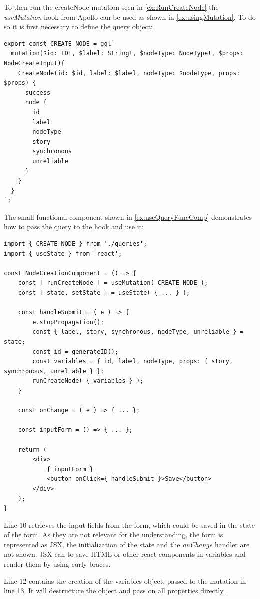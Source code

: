 To then run the createNode mutation seen in \autoref{ex:RunCreateNode} the \emph{useMutation} hook from Apollo can be used as shown in \autoref{ex:usingMutation}. To do so it is first necessary to define the query object:

\begin{lstlisting}[label={ex:DefQuery},caption={Mutation to Create a Node in the Database}]
export const CREATE_NODE = gql`
  mutation($id: ID!, $label: String!, $nodeType: NodeType!, $props: NodeCreateInput){
    CreateNode(id: $id, label: $label, nodeType: $nodeType, props: $props) {
      success
      node {
        id
        label
        nodeType
        story
        synchronous
        unreliable
      }
    }
  }
`;
\end{lstlisting}
\noindent
The small functional component shown in \autoref{ex:useQueryFuncComp} demonstrates how to pass the query to the hook and use it:
\lstset{language=JavaScript}
\begin{lstlisting}[caption={Using the Query in a Component (no actual application code)},label={ex:useQueryFuncComp},float=h]
import { CREATE_NODE } from './queries';
import { useState } from 'react';

const NodeCreationComponent = () => {
	const [ runCreateNode ] = useMutation( CREATE_NODE );
	const [ state, setState ] = useState( { ... } );
	
	const handleSubmit = ( e ) => {
		e.stopPropagation();
		const { label, story, synchronous, nodeType, unreliable } = state; 
		const id = generateID();
		const variables = { id, label, nodeType, props: { story, synchronous, unreliable } }; 
		runCreateNode( { variables } );
	}

	const onChange = ( e ) => { ... };
	
	const inputForm = () => { ... };
	
	return (
		<div>
			{ inputForm }
			<button onClick={ handleSubmit }>Save</button>
		</div>	
	);
}
\end{lstlisting}
Line 10 retrieves the input fields from the form, which could be saved in the state of the form. As they are not relevant for the understanding, the form is represented as JSX, the initialization of the state and the \emph{onChange} handler are not shown. JSX can to save HTML or other react components in variables and render them by using curly braces.

Line 12 contains the creation of the variables object, passed to the mutation in line 13. It will destructure the object and pass on all properties directly.


